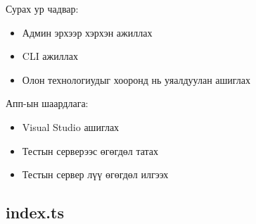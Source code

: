 Сурах ур чадвар: 
\begin{itemize}
    \item Админ эрхээр хэрхэн ажиллах
    \item CLI ажиллах
    \item Олон технологиудыг хооронд нь уяалдуулан ашиглах
\end{itemize}

Апп-ын шаардлага: 
\begin{itemize}
    \item Visual Studio ашиглах
    \item Тестын серверээс өгөгдөл татах
    \item Тестын сервер лүү өгөгдөл илгээх
\end{itemize}

\subsection{index.ts}
